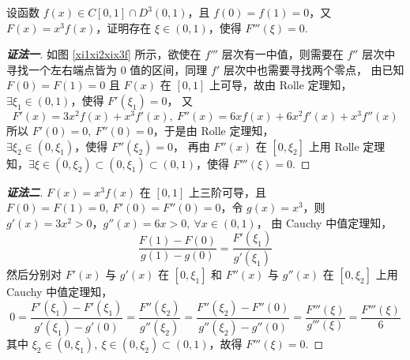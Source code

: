 \begin{example}
    设函数 $f(x)\in C[0,1]\cap D^3(0,1)$，且 $f(0)=f(1)=0$，又 $F(x)=x^3f(x)$，证明存在 $\xi\in(0,1)$，使得 $F'''(\xi)=0.$
\end{example}
\begin{proof}[{\songti \textbf{证法一}}]
    如图 \ref{xi1xi2xix3f} 所示，欲使在 $f'''$ 层次有一中值，则需要在 $f''$ 层次中寻找一个左右端点皆为 0 值的区间，同理 $f'$ 层次中也需要寻找两个零点，
    由已知 $F(0)=F(1)=0$ 且 $F(x)$ 在 $[0,1]$ 上可导，故由 Rolle 定理知，
    $\exists\xi_1\in(0,1)\text{，使得 }F'(\xi_1)=0$，
    又 $$F'(x)=3x^2f(x)+x^3f'(x),~F''(x)=6xf(x)+6x^2f'(x)+x^3f''(x)$$
    所以 $F'(0)=0,~F''(0)=0$，于是由 Rolle 定理知，
    $\exists\xi_2\in(0,\xi_1)\text{，使得 }F''(\xi_2)=0$，
    再由 $F''(x)$ 在 $[0,\xi_2]$ 上用 Rolle 定理知，$\exists\xi\in(0,\xi_2)\subset(0,\xi_1)\subset(0,1)\text{，使得 }F'''(\xi)=0.$
\end{proof}
\begin{proof}[{\songti \textbf{证法二}}]
    $F(x)=x^3f(x)$ 在 $[0,1]$ 上三阶可导，且 $F(0)=F(1)=0,~F'(0)=F''(0)=0$，令 $g(x)=x^3$，则 $g'(x)=3x^2>0$，$g''(x)=6x>0,~\forall x\in(0,1)$，
    由 Cauchy 中值定理知，$$\dfrac{F(1)-F(0)}{g(1)-g(0)}=\dfrac{F'(\xi_1)}{g'(\xi_1)}$$
    然后分别对 $F'(x)$ 与 $g'(x)$ 在 $[0,\xi_1]$ 和 $F''(x)$ 与 $g''(x)$ 在 $[0,\xi_2]$ 上用 Cauchy 中值定理知，
    $$0=\dfrac{F'(\xi_1)-F'(\xi_1)}{g'(\xi_1)-g'(0)}=\dfrac{F''(\xi_2)}{g''(\xi_2)}=\dfrac{F''(\xi_2)-F''(0)}{g''(\xi_2)-g''(0)}=\dfrac{F'''(\xi)}{g'''(\xi)}=\dfrac{F'''(\xi)}{6}$$
    其中 $\xi_2\in(0,\xi_1),~\xi\in(0,\xi_2)\subset(0,1)$，故得 $F'''(\xi)=0.$
\end{proof}

